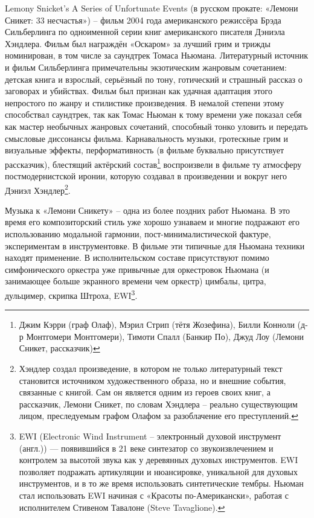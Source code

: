 Lemony Snicket's A Series of Unfortunate Events (в русском прокате: «Лемони Сникет: 33 несчастья») -- фильм 2004 года американского режиссёра Брэда Сильберлинга по одноименной серии книг американского писателя Дэниэла Хэндлера.
Фильм был награждён «Оскаром» за лучший грим и трижды номинирован, в том числе за саундтрек Томаса Ньюмана.
Литературный источник и фильм Сильберлинга примечательны экзотическим жанровым сочетанием: детская книга и взрослый, серьёзный по тону, готический и страшный рассказ о заговорах и убийствах.
Фильм был признан как удачная адаптация этого непростого по жанру и стилистике произведения.
В немалой степени этому способствал саундтрек, так как Томас Ньюман к тому времени уже показал себя как мастер необычных жанровых сочетаний, способный тонко уловить и передать смысловые диссонансы фильма.
Карнавальность музыки, гротескные грим и визуальные эффекты, перформативность (в фильме буквально присутствует рассказчик), блестящий актёрский состав\footnote{Джим Кэрри (граф Олаф), Мэрил Стрип (тётя Жозефина), Билли Конноли (д-р Монтгомери Монтгомери), Тимоти Спалл (Банкир По), Джуд Лоу (Лемони Сникет, рассказчик)} воспроизвели в фильме ту атмосферу постмодернистской иронии, которую создавал в произведении и вокруг него Дэниэл Хэндлер\footnote{Хэндлер создал произведение, в котором не только литературный текст становится источником художественного образа, но и внешние события, связанные с книгой. Сам он является одним из героев своих книг, а рассказчик, Лемони Сникет, по словам Хэндлера -- реально существующим лицом, преследуемым графом Олафом за разоблачение его преступлений.}.

Музыка к «Лемони Сникету» -- одна из более поздних работ Ньюмана.
В это время его композиторский стиль уже хорошо узнаваем и многие подражают его использованию модальной гармонии, пост-минималистической фактуре, экспериментам в инструментовке.
В фильме эти типичные для Ньюмана техники находят применение.
В исполнительском составе присутствуют помимо симфонического оркестра уже привычные для оркестровок Ньюмана (и занимающее больше экранного времени чем оркестр) цимбалы, цитра, дульцимер, скрипка Штроха, EWI\footnote{EWI (Electronic Wind Instrument -- электронный духовой инструмент (англ.)) --- появившийся в 21 веке синтезатор со звукоизвлечением и контролем за высотой звука как у деревянных духовых инструментов. EWI позволяет подражать артикуляции и нюансировке, уникальной для духовых инструментов, и в то же время использовать синтетические тембры. Ньюман стал использовать EWI начиная с «Красоты по-Американски», работая с исполнителем Стивеном Тавалоне (Steve Tavaglione).}.

